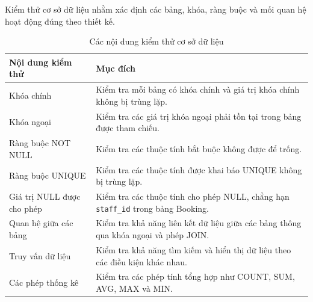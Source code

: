 Kiểm thử cơ sở dữ liệu nhằm xác định các bảng, khóa, ràng buộc và mối quan hệ hoạt động đúng theo thiết kế.

\begin{table}[htbp]
    \centering
    \caption{Các nội dung kiểm thử cơ sở dữ liệu}
    \label{tab:testing_contents}
    \begin{tabularx}{\textwidth}{|p{6cm}|X|}
        \hline
        \textbf{Nội dung kiểm thử} & \textbf{Mục đích} \\ \hline

        Khóa chính &
        Kiểm tra mỗi bảng có khóa chính và giá trị khóa chính không bị trùng lặp.
        \\ \hline

        Khóa ngoại &
        Kiểm tra các giá trị khóa ngoại phải tồn tại trong bảng được tham chiếu.
        \\ \hline

        Ràng buộc NOT NULL &
        Kiểm tra các thuộc tính bắt buộc không được để trống.
        \\ \hline

        Ràng buộc UNIQUE &
        Kiểm tra các thuộc tính được khai báo UNIQUE không bị trùng lặp.
        \\ \hline

        Giá trị NULL được cho phép &
        Kiểm tra các thuộc tính cho phép NULL, chẳng hạn \texttt{staff\_id} trong bảng Booking.
        \\ \hline

        Quan hệ giữa các bảng &
        Kiểm tra khả năng liên kết dữ liệu giữa các bảng thông qua khóa ngoại và phép JOIN.
        \\ \hline

        Truy vấn dữ liệu &
        Kiểm tra khả năng tìm kiếm và hiển thị dữ liệu theo các điều kiện khác nhau.
        \\ \hline

        Các phép thống kê &
        Kiểm tra các phép tính tổng hợp như COUNT, SUM, AVG, MAX và MIN.
        \\ \hline

    \end{tabularx}
\end{table}


